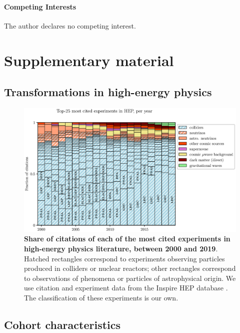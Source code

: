 \documentclass{article}
\begin{document}
\paragraph{Competing Interests}{The author declares no competing interest.}

\printbibliography

\newpage

\appendix

\section{Supplementary material}

\subsection{\label{appendix:landscape}Transformations in high-energy physics}

\begin{figure}[H]
    \centering
    \includegraphics[width=\textwidth]{plots/experiments.eps}
    \caption{\textbf{Share of citations of each of the most cited experiments in high-energy physics literature, between 2000 and 2019}. Hatched rectangles correspond to experiments observing particles produced in colliders or nuclear reactors; other rectangles correspond to observations of phenomena or particles of astrophysical origin. We use citation and experiment data from the Inspire HEP database \citep{InspireAPI}. The classification of these experiments is our own. }
    \label{fig:experiments}
\end{figure}


\subsection{\label{appendix:sample_characteristics}Cohort characteristics}
\end{document}
